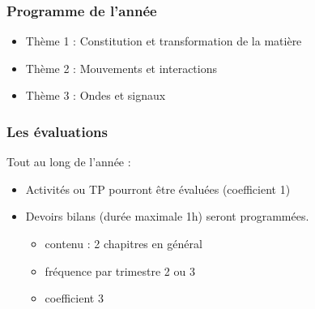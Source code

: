 \documentclass[12pt]{beamer}
\begin{document}
\begin{frame}
    \frametitle{Programme de l'année}
    \begin{itemize}
        \item Thème 1 : Constitution et transformation de la matière
        \item Thème 2 : Mouvements et interactions
        \item Thème 3 : Ondes et signaux
    \end{itemize}
\end{frame}

\begin{frame}
    \frametitle{Les évaluations}
    Tout au long de l'année :
    \begin{itemize}
        \item Activités ou TP pourront être évaluées (coefficient 1)
        \item Devoirs bilans (durée maximale 1h) seront programmées.\\
        \begin{itemize}
            \item contenu : 2 chapitres en général
            \item fréquence par trimestre 2 ou 3
            \item coefficient  3
        \end{itemize}
    \end{itemize}
\end{frame}
\end{document}
